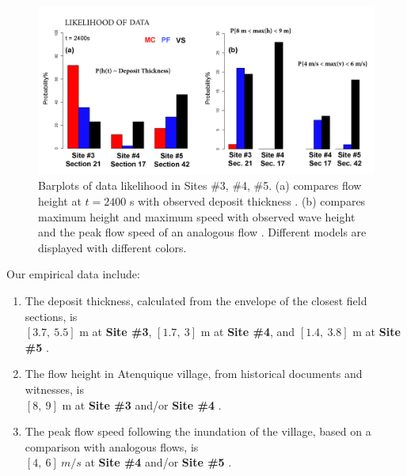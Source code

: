 \documentclass[nhess, manuscript]{copernicus}
\begin{document}
\begin{figure}[H]
\centering
\includegraphics[width=1\textwidth]{Fig10.png}
\caption{Barplots of data likelihood in Sites \#3, \#4, \#5. (a) compares flow height at $t=2400$ s with observed deposit thickness \citep{Saucedo2008}. (b) compares maximum height and maximum speed with observed wave height \citep{PonceSegura1983} and the peak flow speed of an analogous flow \citep{Pierson1985}. Different models are displayed with different colors.}
\label{Fig10}
\end{figure}

Our empirical data include:
\begin{enumerate}
\item The deposit thickness, calculated from the envelope of the closest field sections, is \\ $[3.7,\ 5.5]$ m at \textbf{Site \#3}, $[1.7,\ 3]$ m at \textbf{Site \#4}, and $[1.4,\ 3.8]$ m at \textbf{Site \#5} \citep{Saucedo2008}.
\item The flow height in Atenquique village, from historical documents and witnesses, is \\$[8,\ 9]$ m at \textbf{Site \#3} and/or \textbf{Site \#4} \citep{PonceSegura1983, Saucedo2008}.
\item The peak flow speed following the inundation of the village, based on a comparison with analogous flows, is \\$[4,\ 6]\ m/s$ at \textbf{Site \#4} and/or \textbf{Site \#5} \citep{Pierson1985, Saucedo2008}.
\end{enumerate}
\end{document}
